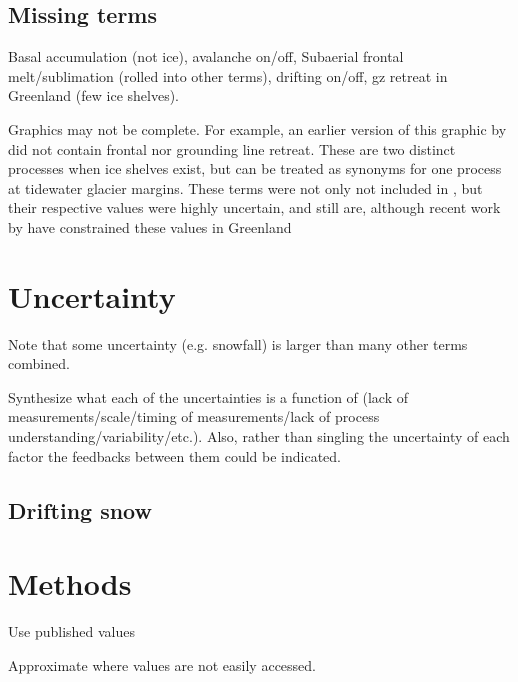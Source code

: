 \documentclass[review,jog]{igs}
\begin{document}
\subsection{Missing terms}

Basal accumulation (not ice), avalanche on/off, Subaerial frontal melt/sublimation (rolled into other terms), drifting on/off, gz retreat in Greenland (few ice shelves).

Graphics may not be complete. For example, an earlier version of this graphic by \citet[Fig. 2]{cogley_2011} did not contain frontal nor grounding line retreat. These are two distinct processes when ice shelves exist, but can be treated as synonyms for one process at tidewater glacier margins. These terms were not only not included in \citet{cogley_2011}, but their respective values were highly uncertain, and still are, although recent work by \citet{kochtitzky_2023,greene_2024} have constrained these values in Greenland

\section{Uncertainty}

Note that some uncertainty (e.g. snowfall) is larger than many other terms combined.

Synthesize what each of the uncertainties is a function of (lack of measurements/scale/timing of measurements/lack of process understanding/variability/etc.). Also, rather than singling the uncertainty of each factor the feedbacks between them could be indicated.

\subsection{Drifting snow}


\section{Methods}

Use published values

Approximate where values are not easily accessed.
\end{document}
